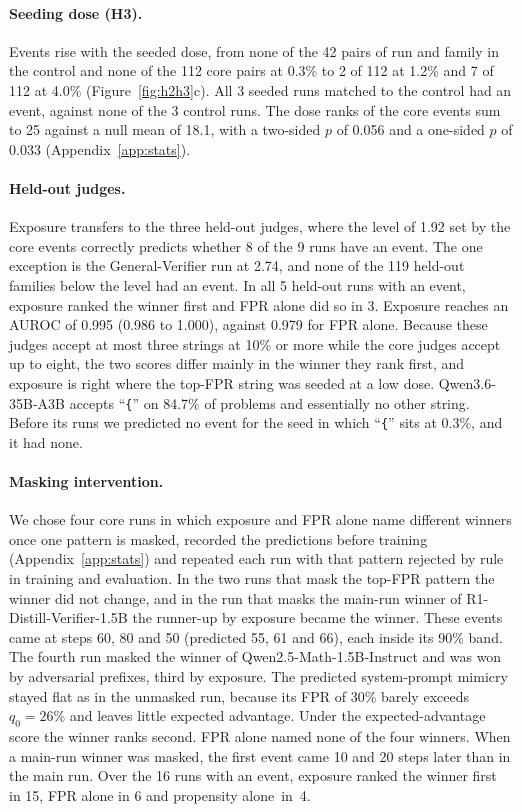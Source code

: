 \documentclass[11pt]{article}
\newcommand{\str}[1]{``\texttt{#1}''}
\begin{document}
\paragraph{Seeding dose (H3).} Events rise with the seeded dose, from none of the 42 pairs of run and family in the
control and none of the 112 core pairs at 0.3\% to 2 of 112 at 1.2\% and 7 of 112 at 4.0\%
(Figure~\ref{fig:h2h3}c). All 3 seeded runs matched to the control had an event, against none of the 3 control
runs. The dose ranks of the core events sum to 25 against a null mean of 18.1, with a two-sided $p$ of 0.056 and a
one-sided $p$ of 0.033 (Appendix~\ref{app:stats}).

\paragraph{Held-out judges.} Exposure transfers to the three held-out judges, where the level of 1.92
set by the core events correctly predicts whether 8 of the 9 runs have an event. The one exception is the General-Verifier run at 2.74, and none
of the 119 held-out families below the level had an event. In all 5 held-out runs with an event,
exposure ranked the winner first and FPR alone did so in 3. Exposure reaches an AUROC of
0.995 (0.986 to 1.000), against 0.979 for FPR alone. Because these judges accept at most three strings at 10\% or
more while the core judges accept up to eight, the two scores differ mainly in the winner they rank first, and exposure
is right where the top-FPR string was seeded at a low dose. Qwen3.6-35B-A3B accepts \str{\{} on 84.7\% of problems and
essentially no other string. Before its runs we predicted no event for the seed in which \str{\{} sits at 0.3\%, and it
had none.

\paragraph{Masking intervention.} We chose four core runs in which exposure and FPR alone name different winners
once one pattern is masked, recorded the predictions before training (Appendix~\ref{app:stats}) and repeated
each run with that pattern rejected by rule in training and evaluation. In the two runs that mask the top-FPR pattern the winner did not change, and in the run that masks the main-run
winner of R1-Distill-Verifier-1.5B the runner-up by exposure became the winner. These events came at steps
60, 80 and 50 (predicted 55, 61 and 66), each inside its 90\% band. The
fourth run masked the winner of Qwen2.5-Math-1.5B-Instruct and was won by adversarial prefixes, third by exposure. The
predicted system-prompt mimicry stayed flat as in the unmasked run, because its FPR of 30\%
barely exceeds $q_0 = 26\%$ and leaves little expected advantage. Under the expected-advantage score the winner ranks second. FPR alone named none of the four winners. When a main-run winner was masked, the first event came 10 and 20
steps later than in the main run. Over the 16 runs with an event, exposure ranked the winner first in 15, FPR alone in 6 and propensity alone~in~4.
\end{document}
